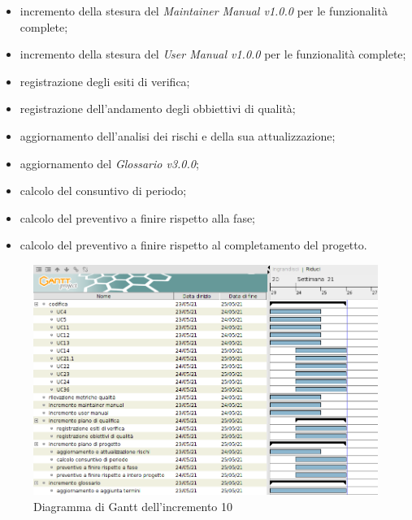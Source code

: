 \begin{itemize}
          \begin{itemize}
              \item incremento della stesura del \textit{Maintainer Manual v1.0.0} per le funzionalità complete;
              \item incremento della stesura del \textit{User Manual v1.0.0} per le funzionalità complete;
              \item registrazione degli esiti di verifica;
              \item registrazione dell'andamento degli obbiettivi di qualità;
              \item aggiornamento dell'analisi dei rischi e della sua attualizzazione;
              \item aggiornamento del \textit{Glossario v3.0.0};
              \item calcolo del consuntivo di periodo;
              \item calcolo del preventivo a finire rispetto alla fase;
              \item calcolo del preventivo a finire rispetto al completamento del progetto.
          \end{itemize}
\end{itemize}
\begin{figure}[!ht]
    \caption{Diagramma di Gantt dell'incremento 10}
    \vspace{5px}
    \includegraphics[scale=0.3]{../../../Images/Diagrammi/Gantt/incremento10.png}
    \centering
\end{figure}

